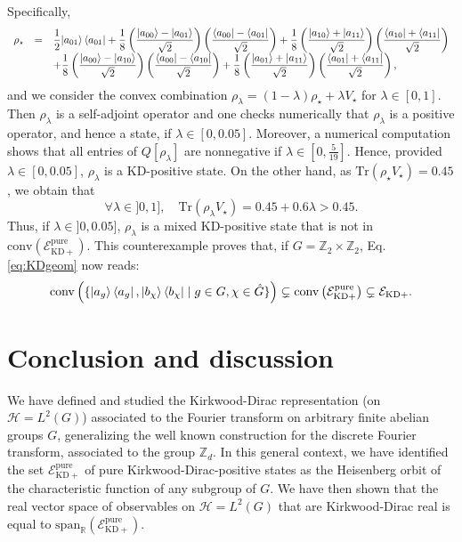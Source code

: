 \documentclass[a4paper, notitlepage, 11pt]{article}
\numberwithin{equation}{section}
\newcommand{\cket}[1]{|#1\rangle}
\newcommand{\mcl}[1]{\ensuremath{\mathcal{#1}}}
\newcommand{\EcalKDC}{{\mcl E}_{\mathrm{KD+}}}
\newcommand{\EcalKDCpu}{{\mcl E}_{\mathrm{KD+}}^{\mathrm{pure}}}
\newcommand{\spanR}{{\mathrm{span}_{\R}}}
\newcommand{\Hcal}{{\mcl H}}
\newcommand{\Z}{\mathbb{Z}}
\newcommand{\R}{\mathbb{R}}
\newcommand{\conv}[1]{\mathrm{conv}\left(#1\right)}
\begin{document}
Specifically,
\begin{equation}
\begin{array}{rcl}
\rho_{\star}  &=& \displaystyle\frac{1}{2}\cket{a_{01}}\bra{a_{01}} + \frac{1}{8}\left(\frac{\cket{a_{00}} - \cket{a_{01}}}{\sqrt{2}}\right)\left(\frac{\bra{a_{00}} - \bra{a_{01}}}{\sqrt{2}}\right) + \frac{1}{8}\left(\frac{\cket{a_{10}} + \cket{a_{11}}}{\sqrt{2}}\right)\left(\frac{\bra{a_{10}}+ \bra{a_{11}}}{\sqrt{2}}\right) \\
&& \displaystyle +\frac{1}{8}\left(\frac{\cket{a_{00}} - \cket{a_{10}}}{\sqrt{2}}\right)\left(\frac{\bra{a_{00}} - \bra{a_{10}}}{\sqrt{2}}\right) + \frac{1}{8}\left(\frac{\cket{a_{01}} + \cket{a_{11}}}{\sqrt{2}}\right)\left(\frac{\bra{a_{01}} + \bra{a_{11}}}{\sqrt{2}}\right),
\end{array}
\end{equation}
and we consider the convex combination $ \rho_{\lambda} =  (1-\lambda)\rho_{\star}+\lambda V_{\star}$ for $\lambda\in [0,1]$. Then $\rho_{\lambda}$ is a self-adjoint operator and one checks numerically that $\rho_{\lambda}$ is a positive operator, and hence a state, if $\lambda\in [0,0.05]$. Moreover, a numerical computation shows that all entries of $Q[\rho_{\lambda}]$ are nonnegative if $\lambda\in[0,\frac{5}{19}]$.
Hence, provided $\lambda\in [0,0.05]$, $\rho_\lambda$ is a KD-positive state. On the other hand, as $\mathrm{Tr}(\rho_{\star} V_{\star}) = 0.45$, we obtain that
\[
\forall \lambda \in ]0,1], \quad \mathrm{Tr}(\rho_{\lambda}V_{\star}) = 0.45 + 0.6\lambda>0.45.
\]
Thus, if $\lambda\in ]0,0.05]$, $\rho_{\lambda}$ is a mixed KD-positive state that is not in $\conv{\EcalKDCpu}$.
This counterexample proves that, if $G = \Z_2\times\Z_2$, Eq.\eqref{eq:KDgeom} now reads:
\[
\conv{\{\cket{a_g}\bra{a_g}, \cket{b_\chi}\bra{b_\chi}\mid g\in G, \chi\in \hat{G}\}}\subsetneq \conv{\EcalKDCpu}\subsetneq \EcalKDC.
\]
\section{Conclusion and discussion}

We  have defined and studied the Kirkwood-Dirac representation (on $\Hcal=L^2(G)$)  associated to the  Fourier transform on arbitrary finite abelian groups $G$, generalizing the well known construction for the discrete Fourier transform, associated to the group $\Z_d$.  In this general context, we have identified the set $\EcalKDCpu$ of pure Kirkwood-Dirac-positive states as the Heisenberg orbit of the characteristic function of any subgroup of $G$. We have then shown that the real vector space of observables on $\Hcal=L^2(G)$ that are Kirkwood-Dirac real is equal to $\spanR{(\EcalKDCpu)}$. 
\end{document}
